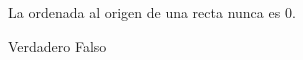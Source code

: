 La ordenada al origen de una recta nunca es 0.

\begin{oneparchoices}
    \choice Verdadero
    \CorrectChoice Falso
\end{oneparchoices}